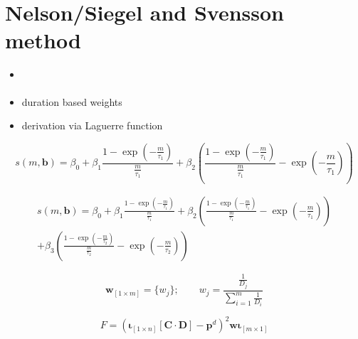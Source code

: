
\section{Nelson/Siegel and Svensson method}
\label{sec:nels-svenss-meth}


\begin{itemize}
\item \cite{Geyer1999}
\item duration based weights \cite{Bliss1997}
\item derivation via Laguerre function
\end{itemize}

\begin{equation}
  \label{eq:nelson-spot}
   s(m,\bm{b}) = \beta_0 + \beta_1\frac{1-\exp(-\frac{m}{\tau_1})}{\frac{m}{\tau_1}} + \beta_2\left(\frac{1-\exp(-\frac{m}{\tau_1})}{\frac{m}{\tau_1}} - \exp(-\frac{m}{\tau_1})\right)
\end{equation}

 



\begin{multline}\label{eq:svensson-spot}
    s(m,\bm{b}) = \beta_0 + \beta_1\frac{1-\exp(-\frac{m}{\tau_1})}{\frac{m}{\tau_1}} + \beta_2\left(\frac{1-\exp(-\frac{m}{\tau_1})}{\frac{m}{\tau_1}} - \exp(-\frac{m}{\tau_1})\right) \\+ \beta_3\left(\frac{1-\exp(-\frac{m}{\tau_2})}{\frac{m}{\tau_2}} - \exp(-\frac{m}{\tau_2})\right)
\end{multline}


\begin{equation}\label{eq:weights}
  \bm{w}_{\left[1\times m\right]}= \{w_j\}; \qquad   w_j=\frac{\frac{1}{D_j}}{\sum_{i=1}^m\frac{1}{D_i}}
\end{equation}


\begin{equation}\label{eq:objfct-nelson}
	F=\left( \bm{\iota}_{\left[1 \times n\right]}\left[\bm{C}\cdot\bm{D}\right] - 		\bm{p}^d\right)^2 \bm{w}\bm{\iota}_{\left[m \times 1\right]}
\end{equation}





